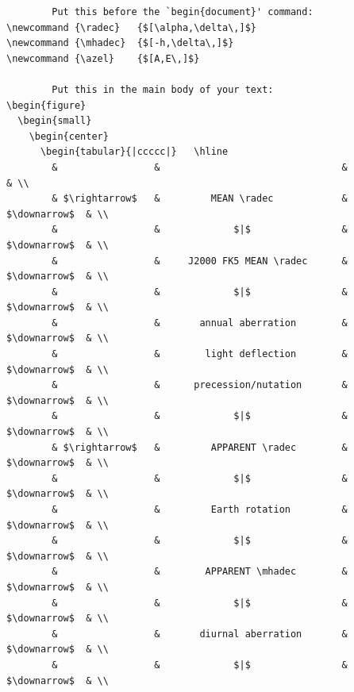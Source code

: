 \documentclass[twoside,11pt]{article}
\newcommand{\radec}{$[\alpha,\delta\,]$}
\newcommand{\mhadec}{$[-h,\delta\,]$}
\newcommand{\azel}{$[A,E\,]$}
\begin{document}
\scriptsize
\begin{verbatim}
        Put this before the `begin{document}' command:
\newcommand {\radec}   {$[\alpha,\delta\,]$}
\newcommand {\mhadec}  {$[-h,\delta\,]$}
\newcommand {\azel}    {$[A,E\,]$}

        Put this in the main body of your text:
\begin{figure}
  \begin{small}
    \begin{center}
      \begin{tabular}{|ccccc|}   \hline
        &                 &                                &                & \\
        & $\rightarrow$   &         MEAN \radec            &  $\downarrow$  & \\
        &                 &             $|$                &  $\downarrow$  & \\
        &                 &     J2000 FK5 MEAN \radec      &  $\downarrow$  & \\
        &                 &             $|$                &  $\downarrow$  & \\
        &                 &       annual aberration        &  $\downarrow$  & \\
        &                 &        light deflection        &  $\downarrow$  & \\
        &                 &      precession/nutation       &  $\downarrow$  & \\
        &                 &             $|$                &  $\downarrow$  & \\
        & $\rightarrow$   &         APPARENT \radec        &  $\downarrow$  & \\
        &                 &             $|$                &  $\downarrow$  & \\
        &                 &         Earth rotation         &  $\downarrow$  & \\
        &                 &             $|$                &  $\downarrow$  & \\
        &                 &        APPARENT \mhadec        &  $\downarrow$  & \\
        &                 &             $|$                &  $\downarrow$  & \\
        &                 &       diurnal aberration       &  $\downarrow$  & \\
        &                 &             $|$                &  $\downarrow$  & \\

\end{verbatim}
\end{document}
